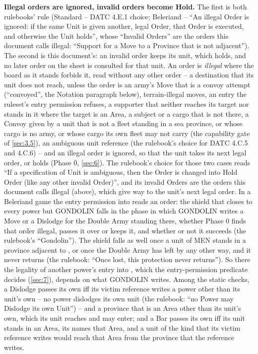 \documentclass[12pt,a4paper]{article}
\begin{document}
\textbf{Illegal orders are ignored, invalid orders become Hold.}
The first is both rulebooks' rule (Standard -- DATC 4.E.1 choice; Beleriand -- ``An illegal Order is ignored: if the same Unit is given another, legal Order, that Order is executed, and otherwise the Unit holds'', whose ``Invalid Orders'' are the orders this document calls illegal: ``Support for a Move to a Province that is not adjacent'').
The second is this document's: an invalid order keeps its unit, which holds, and no later order on the sheet is consulted for that unit.
An order is \emph{illegal} where the board as it stands forbids it, read without any other order -- a destination that its unit does not reach, unless the order is an army's Move that is a convoy attempt (``convoyed'', the Notation paragraph below), terrain-illegal moves, an entry the ruleset's entry permission refuses, a supporter that neither reaches its target nor stands in it where the target is an Area, a subject or a cargo that is not there, a Convoy given by a unit that is not a fleet standing in a sea province, or whose cargo is no army, or whose cargo its own fleet may not carry (the capability gate of \cref{sec:3.5}), an ambiguous unit reference (the rulebook's choice for DATC 4.C.5 and 4.C.6) -- and an illegal order is ignored, so that the unit takes its next legal order, or holds (Phase 0, \cref{sec:6}).
The rulebook's choice for those two cases reads ``If a specification of Unit is ambiguous, then the Order is changed into Hold Order (like any other invalid Order)'', and its invalid Orders are the orders this document calls illegal (above), which give way to the unit's next legal order.
In a Beleriand game the entry permission into  reads an order: the shield that closes  to every power but GONDOLIN falls in the phase in which GONDOLIN writes a Move or a Dislodge for the Double Army standing there, whether Phase 0 finds that order illegal, passes it over or keeps it, and whether or not it succeeds (the rulebook's ``Gondolin'').
The shield falls as well once a unit of MEN stands in a province adjacent to , or once the Double Army has left  by any other way, and it never returns (the rulebook: ``Once lost, this protection never returns'').
So there the legality of another power's entry into , which the entry-permission predicate decides (\cref{sec:7}), depends on what GONDOLIN writes.
Among the static checks, a Dislodge passes its own iff its victim reference writes a power other than its unit's own -- no power dislodges its own unit (the rulebook: ``no Power may Dislodge its own Unit'') -- and a province that is an Area other than its unit's own, which its unit reaches and may enter; and a Bar passes its own iff its unit stands in an Area, its  names that Area, and a unit of the kind that its victim reference writes would reach that Area from the province that the reference writes.
\end{document}
